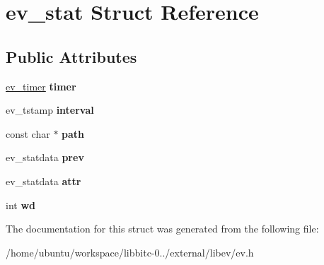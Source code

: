\hypertarget{structev__stat}{\section{ev\-\_\-stat Struct Reference}
\label{structev__stat}
}
\subsection*{Public Attributes}
\begin{DoxyCompactItemize}
\item 
\hypertarget{structev__stat_acec38fb069a9dd9c8f57ea1ca0c70076}{\hyperlink{structev__timer}{ev\-\_\-timer} {\bfseries timer}}\label{structev__stat_acec38fb069a9dd9c8f57ea1ca0c70076}

\item 
\hypertarget{structev__stat_a41db8a24ee882bd042baef97ca153def}{ev\-\_\-tstamp {\bfseries interval}}\label{structev__stat_a41db8a24ee882bd042baef97ca153def}

\item 
\hypertarget{structev__stat_a90d741ec1bba36e053b47d187b8d377e}{const char $\ast$ {\bfseries path}}\label{structev__stat_a90d741ec1bba36e053b47d187b8d377e}

\item 
\hypertarget{structev__stat_a1c5c01c31a95d2062385993ce0a931bf}{ev\-\_\-statdata {\bfseries prev}}\label{structev__stat_a1c5c01c31a95d2062385993ce0a931bf}

\item 
\hypertarget{structev__stat_a7988df9156ed36966c979ed78e576350}{ev\-\_\-statdata {\bfseries attr}}\label{structev__stat_a7988df9156ed36966c979ed78e576350}

\item 
\hypertarget{structev__stat_ad0c919954f8bc21de322381f0821a06f}{int {\bfseries wd}}\label{structev__stat_ad0c919954f8bc21de322381f0821a06f}

\end{DoxyCompactItemize}


The documentation for this struct was generated from the following file\-:\begin{DoxyCompactItemize}
\item 
/home/ubuntu/workspace/libbitc-\/0../external/libev/ev.\-h\end{DoxyCompactItemize}
